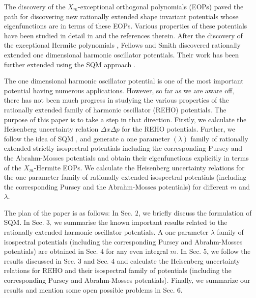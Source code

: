 \documentclass[11pt]{article}
\begin{document}
The discovery of the \( X_m \)-exceptional orthogonal polynomials (EOPs) 
\cite{gomez2009extended, gomez2010exceptional, gomez2012orthogonal} paved the 
path for discovering new rationally extended shape invariant 
potentials whose eigenfunctions are in terms of these EOPs. Various properties 
of these potentials have been studied in detail in \cite{midya2009exceptional, ho2011dirac, yadav2013scattering, yadav2015scattering, ho2014scattering, yadav2015group, kumari2016scattering, yadav2016parametric, kumari2017class, 
yadav2019rationally, basu2017quasi, banerjee2022solutions, ramos2017short} and the references 
therein. After the discovery of the exceptional Hermite polynomials 
\cite{gomez2013rational}, Fellows and Smith 
\cite{fellows2009factorization} discovered rationally extended one 
dimensional harmonic oscillator potentials. Their work has been further 
extended using the SQM 
approach \cite{marquette2013two}.

The one dimensional harmonic oscillator potential is one of the most important
potential having numerous applications. However, so far as we are aware off, 
there has not been much progress in studying the various properties of the 
rationally extended family of harmonic oscillator (REHO) potentials. The 
purpose of this paper is to take a step in that direction. Firstly, we 
calculate the Heisenberg uncertainty relation $\Delta x \Delta p$ for the
REHO potentials. Further, we follow the idea of SQM 
\cite{cooper1995supersymmetry}, and generate
a one parameter $(\lambda)$ family of rationally extended strictly isospectral 
potentials including the corresponding Pursey and the Abrahm-Mosses potentials
and obtain their eigenfunctions explicitly in terms of the $X_m$-Hermite EOPs. We calculate the Heisenberg uncertainty relations for the one 
parameter family of rationally extended isospectral potentials (including the
corresponding Pursey and the Abrahm-Mosses potentials) for different $m$ and 
$\lambda$.

The plan of the paper is as follows: In Sec. $2$, we briefly discuss the 
formulation of SQM. In Sec. $3$, we summarise the known important results 
related to the rationally extended harmonic oscillator potentials. 
A one parameter $\lambda$ family of isospectral potentials (including the 
corresponding Pursey and Abrahm-Mosses potentials) are obtained in 
Sec. $4$ for any even integral $m$. In Sec. $5$, we follow the results 
discussed in Sec. $3$ and Sec. $4$ and calculate the Heisenberg uncertainty 
relations for REHO and their isospectral family of potentials (including the
corresponding Pursey and Abrahm-Mosses potentials). Finally, we 
summarize our results and mention some open possible problems in Sec. $6$. 
\end{document}
